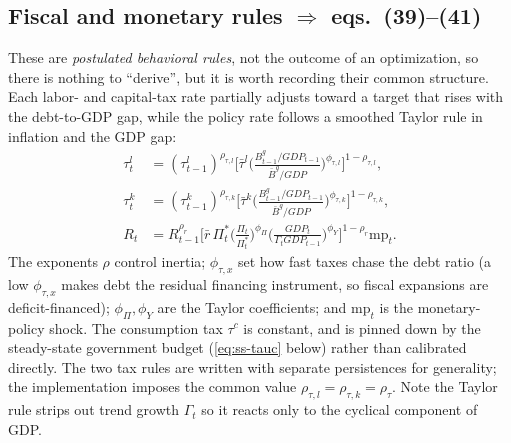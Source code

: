 \subsection{Fiscal and monetary rules \texorpdfstring{$\Rightarrow$}{=>} eqs.\ (39)--(41)}
These are \emph{postulated behavioral rules}, not the outcome of an optimization, so there is nothing
to ``derive'', but it is worth recording their common structure. Each labor- and capital-tax rate
partially adjusts toward a target that rises with the debt-to-GDP gap, while the policy rate follows a
smoothed Taylor rule in inflation and the GDP gap:
\begin{align}
\tau^l_t&=(\tau^l_{t-1})^{\rho_{\tau,l}}\Big[\bar\tau^l\big(\tfrac{B^g_{t-1}/GDP_{t-1}}{\bar B^g/GDP}\big)^{\phi_{\tau,l}}\Big]^{1-\rho_{\tau,l}},\tag{P-39}\\
\tau^k_t&=(\tau^k_{t-1})^{\rho_{\tau,k}}\Big[\bar\tau^k\big(\tfrac{B^g_{t-1}/GDP_{t-1}}{\bar B^g/GDP}\big)^{\phi_{\tau,k}}\Big]^{1-\rho_{\tau,k}},\tag{P-40}\\
R_t&=R_{t-1}^{\rho_r}\Big[\bar r\,\Pi^*_t\big(\tfrac{\Pi_t}{\Pi^*_t}\big)^{\phi_\Pi}\big(\tfrac{GDP_t}{\Gamma_tGDP_{t-1}}\big)^{\phi_Y}\Big]^{1-\rho_r}\mathrm{mp}_t.\tag{P-41}
\end{align}
The exponents $\rho$ control inertia; $\phi_{\tau,x}$ set how fast taxes chase the debt ratio (a low
$\phi_{\tau,x}$ makes debt the residual financing instrument, so fiscal expansions are deficit-financed);
$\phi_\Pi,\phi_Y$ are the Taylor coefficients; and $\mathrm{mp}_t$ is the monetary-policy shock. The
consumption tax $\tau^c$ is constant, and is pinned down by the steady-state government budget
(\eqref{eq:ss-tauc} below) rather than calibrated directly. The two tax rules are written with separate
persistences for generality; the implementation imposes the common value
$\rho_{\tau,l}=\rho_{\tau,k}=\rho_\tau$. Note the Taylor rule strips out trend growth $\Gamma_t$ so it
reacts only to the cyclical component of GDP.

